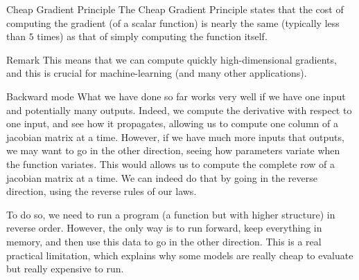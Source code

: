 \documentclass[a4paper]{article}
\begin{document}
\begin{parag}{Cheap Gradient Principle}
    The Cheap Gradient Principle states that the cost of computing the gradient (of a scalar function) is nearly the same (typically less than $5$ times) as that of simply computing the function itself.

    \begin{subparag}{Remark}
        This means that we can compute quickly high-dimensional gradients, and this is crucial for machine-learning (and many other applications).
    \end{subparag}
\end{parag}


\begin{parag}{Backward mode}
    What we have done so far works very well if we have one input and potentially many outputs. Indeed, we compute the derivative with respect to one input, and see how it propagates, allowing us to compute one column of a jacobian matrix at a time. However, if we have much more inputs that outputs, we may want to go in the other direction, seeing how parameters variate when the function variates. This would allows us to compute the complete row of a jacobian matrix at a time. We can indeed do that by going in the reverse direction, using the reverse rules of our laws.

    To do so, we need to run a program (a function but with higher structure) in reverse order. However, the only way is to run forward, keep everything in memory, and then use this data to go in the other direction. This is a real practical limitation, which explains why some models are really cheap to evaluate but really expensive to run.
\end{parag}
\end{document}

